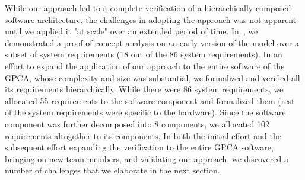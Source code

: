 While our approach led to a complete verification of a hierarchically composed software architecture, the challenges in adopting the approach was not apparent until we applied it "at scale" over an extended period of time. In~\cite{hilt2013}, we demonstrated a proof of concept analysis on an early version of the model over a subset of system requirements (18 out of the 86 system requirements). In an effort to expand the application of our approach to the entire software of the GPCA, whose complexity and size was substantial, we formalized and verified all its requirements hierarchically. While there were 86 system requirements, we allocated 55 requirements to the software component and formalized them (rest of the system requirements were specific to the hardware). Since the software component was further decomposed into 8 components, we allocated 102 requirements altogether to its  components. In both the initial effort and the subsequent effort expanding the verification to the entire GPCA software, bringing on new team members, and validating our approach, we discovered a number of challenges that we elaborate in the next section.


%
%


